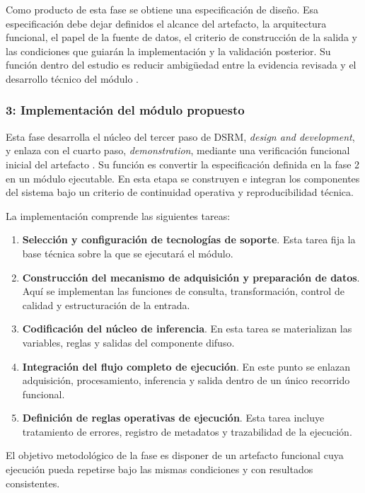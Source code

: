 Como producto de esta fase se obtiene una especificación de diseño. Esa especificación debe dejar definidos el alcance del artefacto, la arquitectura funcional, el papel de la fuente de datos, el criterio de construcción de la salida y las condiciones que guiarán la implementación y la validación posterior. Su función dentro del estudio es reducir ambigüedad entre la evidencia revisada y el desarrollo técnico del módulo \cite[pp.~84--85]{METDSR01}.

\subsubsection{3: Implementación del módulo propuesto}
Esta fase desarrolla el núcleo del tercer paso de DSRM, \emph{design and development}, y enlaza con el cuarto paso, \emph{demonstration}, mediante una verificación funcional inicial del artefacto \cite[pp.~55--56]{METDSRM01}. Su función es convertir la especificación definida en la fase 2 en un módulo ejecutable. En esta etapa se construyen e integran los componentes del sistema bajo un criterio de continuidad operativa y reproducibilidad técnica.

La implementación comprende las siguientes tareas:
\begin{enumerate}
\item \textbf{Selección y configuración de tecnologías de soporte}. Esta tarea fija la base técnica sobre la que se ejecutará el módulo.
\item \textbf{Construcción del mecanismo de adquisición y preparación de datos}. Aquí se implementan las funciones de consulta, transformación, control de calidad y estructuración de la entrada.
\item \textbf{Codificación del núcleo de inferencia}. En esta tarea se materializan las variables, reglas y salidas del componente difuso.
\item \textbf{Integración del flujo completo de ejecución}. En este punto se enlazan adquisición, procesamiento, inferencia y salida dentro de un único recorrido funcional.
\item \textbf{Definición de reglas operativas de ejecución}. Esta tarea incluye tratamiento de errores, registro de metadatos y trazabilidad de la ejecución.
\end{enumerate}

El objetivo metodológico de la fase es disponer de un artefacto funcional cuya ejecución pueda repetirse bajo las mismas condiciones y con resultados consistentes.

